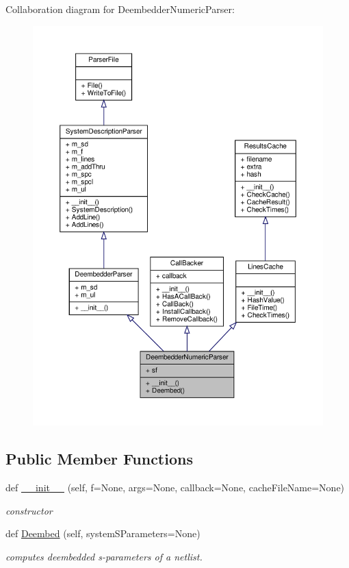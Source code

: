 Collaboration diagram for Deembedder\+Numeric\+Parser\+:
\nopagebreak
\begin{figure}[H]
\begin{center}
\leavevmode
\includegraphics[width=350pt]{classSignalIntegrity_1_1Parsers_1_1DeembedderNumericParser_1_1DeembedderNumericParser__coll__graph}
\end{center}
\end{figure}
\subsection*{Public Member Functions}
\begin{DoxyCompactItemize}
\item 
def \hyperlink{classSignalIntegrity_1_1Parsers_1_1DeembedderNumericParser_1_1DeembedderNumericParser_a5ce77900c33ce9b681aebb5c527ab92a}{\+\_\+\+\_\+init\+\_\+\+\_\+} (self, f=None, args=None, callback=None, cache\+File\+Name=None)
\begin{DoxyCompactList}\small\item\em constructor \end{DoxyCompactList}\item 
def \hyperlink{classSignalIntegrity_1_1Parsers_1_1DeembedderNumericParser_1_1DeembedderNumericParser_aa04b7e5ad8ffcfb9ef4f6f1fd03594b3}{Deembed} (self, system\+S\+Parameters=None)
\begin{DoxyCompactList}\small\item\em computes deembedded s-\/parameters of a netlist. \end{DoxyCompactList}\end{DoxyCompactItemize}


